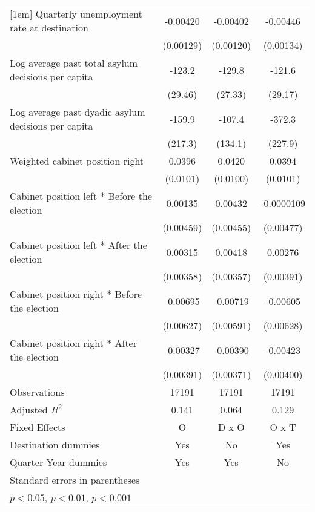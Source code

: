 \begin{table}[htbp]
\begin{tabular}{l*{3}{c}}
[1em]
Quarterly unemployment rate at destination&    -0.00420\sym{**} &    -0.00402\sym{**} &    -0.00446\sym{**} \\
                    &   (0.00129)         &   (0.00120)         &   (0.00134)         \\
[1em]
Log average past total asylum decisions per capita&      -123.2\sym{***}&      -129.8\sym{***}&      -121.6\sym{***}\\
                    &     (29.46)         &     (27.33)         &     (29.17)         \\
[1em]
Log average past dyadic asylum decisions per capita&      -159.9         &      -107.4         &      -372.3         \\
                    &     (217.3)         &     (134.1)         &     (227.9)         \\
[1em]
Weighted cabinet position right&      0.0396\sym{***}&      0.0420\sym{***}&      0.0394\sym{***}\\
                    &    (0.0101)         &    (0.0100)         &    (0.0101)         \\
[1em]
Cabinet position left * Before the election&     0.00135         &     0.00432         &  -0.0000109         \\
                    &   (0.00459)         &   (0.00455)         &   (0.00477)         \\
[1em]
Cabinet position left * After the election&     0.00315         &     0.00418         &     0.00276         \\
                    &   (0.00358)         &   (0.00357)         &   (0.00391)         \\
[1em]
Cabinet position right * Before the election&    -0.00695         &    -0.00719         &    -0.00605         \\
                    &   (0.00627)         &   (0.00591)         &   (0.00628)         \\
[1em]
Cabinet position right * After the election&    -0.00327         &    -0.00390         &    -0.00423         \\
                    &   (0.00391)         &   (0.00371)         &   (0.00400)         \\
\hline
Observations        &       17191         &       17191         &       17191         \\
Adjusted \(R^{2}\)  &       0.141         &       0.064         &       0.129         \\
Fixed Effects       &           O         &       D x O         &       O x T         \\
Destination dummies &         Yes         &          No         &         Yes         \\
Quarter-Year dummies&         Yes         &         Yes         &          No         \\
\hline\hline
\multicolumn{4}{l}{\footnotesize Standard errors in parentheses}\\
\multicolumn{4}{l}{\footnotesize \sym{*} \(p<0.05\), \sym{**} \(p<0.01\), \sym{***} \(p<0.001\)}\\
\end{tabular}
\end{table}
